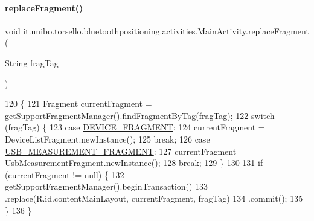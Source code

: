 \hypertarget{classit_1_1unibo_1_1torsello_1_1bluetoothpositioning_1_1activities_1_1MainActivity_a98db4478d28cd91118138d0b652ceb2c_a98db4478d28cd91118138d0b652ceb2c}{}\label{classit_1_1unibo_1_1torsello_1_1bluetoothpositioning_1_1activities_1_1MainActivity_a98db4478d28cd91118138d0b652ceb2c_a98db4478d28cd91118138d0b652ceb2c} 
\paragraph{\texorpdfstring{replace\+Fragment()}{replaceFragment()}}
{\footnotesize\ttfamily void it.\+unibo.\+torsello.\+bluetoothpositioning.\+activities.\+Main\+Activity.\+replace\+Fragment (\begin{DoxyParamCaption}\item[{String}]{frag\+Tag }\end{DoxyParamCaption})}


\begin{DoxyCode}
120                                                 \{
121         Fragment currentFragment = getSupportFragmentManager().findFragmentByTag(fragTag);
122         \textcolor{keywordflow}{switch} (fragTag) \{
123             \textcolor{keywordflow}{case} \hyperlink{classit_1_1unibo_1_1torsello_1_1bluetoothpositioning_1_1activities_1_1MainActivity_a2f77c0245ac2525dc58905e38e1817d1_a2f77c0245ac2525dc58905e38e1817d1}{DEVICE\_FRAGMENT}:
124                 currentFragment = DeviceListFragment.newInstance();
125                 \textcolor{keywordflow}{break};
126             \textcolor{keywordflow}{case} \hyperlink{classit_1_1unibo_1_1torsello_1_1bluetoothpositioning_1_1activities_1_1MainActivity_a64bac06e6db556ba1e36c8773e61137b_a64bac06e6db556ba1e36c8773e61137b}{USB\_MEASUREMENT\_FRAGMENT}:
127                 currentFragment = UsbMeasurementFragment.newInstance();
128                 \textcolor{keywordflow}{break};
129         \}
130 
131         \textcolor{keywordflow}{if} (currentFragment != null) \{
132             getSupportFragmentManager().beginTransaction()
133                     .replace(R.id.contentMainLayout, currentFragment, fragTag)
134                     .commit();
135         \}
136     \}
\end{DoxyCode}


